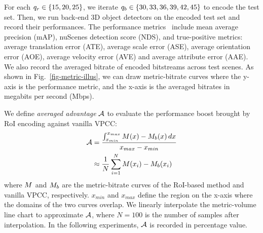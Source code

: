 For each ${q_{r}}\in\{15,20,25\}$, we iterate ${q_{b}}\in\{30,33,36,39,42,45\}$ to encode the test set. Then, we run back-end 3D object detectors on the encoded test set and record their performances. The performance metrics~\cite{caesarnuScenesMultimodalDataset2020} include mean average precision (mAP), nuScenes detection score (NDS), and true-positive metrics: average translation error (ATE), average scale error (ASE), average orientation error (AOE), average velocity error (AVE) and average attribute error (AAE). We also record the averaged bitrate of encoded bitstreams across test scenes. As shown in Fig.~\ref{fig-metric-illus}, we can draw metric-bitrate curves where the y-axis is the performance metric, and the x-axis is the averaged bitrates in megabits per second (Mbps). 

We define \textit{averaged advantage} $\mathcal{A}$ to evaluate the performance boost brought by RoI encoding against vanilla VPCC:
\begin{align}
    \mathcal{A} &= \frac{\int_{x_{min}}^{x_{max}} M(x) - M_{b}(x) \, dx }{x_{max}-x_{min}}\\
                   &\approx \frac{1}{N} \sum_{i=1}^{N} M(x_i) - M_{b}(x_i) \nonumber
\end{align}
where $M$ and $M_{b}$ are the metric-bitrate curves of the RoI-based method and vanilla VPCC, respectively. $ x_{min} $ and $ x_{max} $ define the region on the x-axis where the domains of the two curves overlap. We linearly interpolate the metric-volume line chart to approximate $\mathcal{A}$, where $N=100$ is the number of samples after interpolation. In the following experiments, $\mathcal{A}$ is recorded in percentage value.

